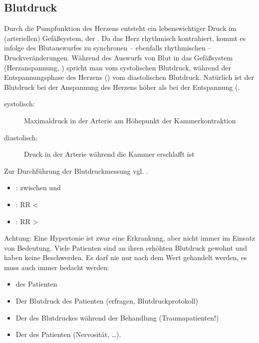 \subsection{Blutdruck} 
\label{topic:blutdruck}



% 
% 

{Durch die Pumpfunktion des Herzens entsteht ein
lebenswichtiger Druck im (arteriellen) Gefäßsystem, der
.
Da das Herz rhythmisch kontrahiert, kommt es infolge des
Blutauswurfes zu synchronen -- ebenfalls rhythmischen --
Druckveränderungen. Während des Auswurfs von Blut in das
Gefäßsystem (Herzanspannung, ) spricht man vom
systolischen Blutdruck, während der Entspannungsphase des
Herzens () vom diastolischen Blutdruck.
Natürlich ist der Blutdruck bei der Anspannung des Herzens
höher als bei der Entspannung (.
}{
\begin{description}
  \item[systolisch:] Maximaldruck in der Arterie am
  Höhepunkt der
  Kammerkontraktion
  \item[diastolisch:] Druck in der Arterie während die
  Kammer erschlafft ist
\end{description}
}{}{}{}


Zur Durchführung der Blutdruckmessung vgl.
.




\begin{itemize}
    \item {}: zwischen  und
     
    \item {}: RR {\textless}~
    \item {}: RR
    {\textgreater}~
\end{itemize}


Achtung: Eine Hypertonie ist zwar eine Erkrankung, aber
nicht immer im Einsatz von Bedeutung. Viele Patienten sind
an ihren erhöhten Blutdruck gewohnt und haben keine
Beschwerden. Es darf nie nur nach dem Wert gehandelt werden,
es muss auch immer bedacht werden:
\begin{itemize}
    \item {} des Patienten
    \item Der  Blutdruck des Patienten
    (erfragen, Blutdruckprotokoll)
    \item Der  des Blutdruckes während der
    Behandlung (Traumapatienten!)
    \item Der  des Patienten (Nervosität, \ldots).
\end{itemize}

